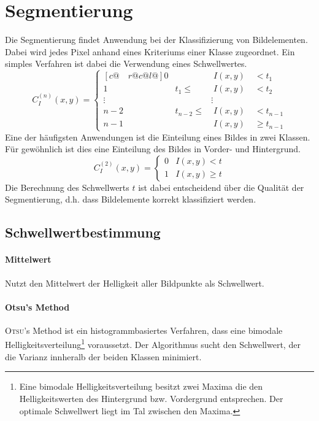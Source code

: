 \section*{Segmentierung}

Die Segmentierung findet Anwendung bei der Klassifizierung von Bildelementen.
Dabei wird jedes Pixel anhand eines Kriteriums einer Klasse zugeordnet.
Ein simples Verfahren ist dabei die Verwendung eines Schwellwertes.
  \[ C_I^{(n)}(x,y) = \begin{cases}[c@{\quad}r@{}c@{}l@{}]
       0      &              & \;I(x,y) & \;<    t_1     \\
       1      & t_1     \leq & \;I(x,y) & \;<    t_2     \\
       \vdots &              &   \vdots &                \\
       n-2    & t_{n-2} \leq & \;I(x,y) & \;<    t_{n-1} \\
       n-1    &              & \;I(x,y) & \;\geq t_{n-1}
     \end{cases} \]
Eine der häufigsten Anwendungen ist die Einteilung eines Bildes in zwei Klassen.
Für gewöhnlich ist dies eine Einteilung des Bildes in Vorder- und Hintergrund.
  \[ C_I^{(2)}(x,y) = \begin{cases}
       0 & I(x,y) <    t \\
       1 & I(x,y) \geq t
     \end{cases} \]
Die Berechnung des Schwellwerts $t$ ist dabei entscheidend über die Qualität der Segmentierung, d.h. dass Bildelemente korrekt klassifiziert werden.

\subsection*{Schwellwertbestimmung}

\paragraph{Mittelwert}
Nutzt den Mittelwert der Helligkeit aller Bildpunkte als Schwellwert.

\paragraph{Otsu's Method}
\textsc{Otsu}'s Method ist ein histogrammbasiertes Verfahren, dass eine bimodale Helligkeitsverteilung\footnote{Eine bimodale Helligkeitsverteilung besitzt zwei Maxima die den Helligkeitswerten des Hintergrund bzw. Vordergrund entsprechen. Der optimale Schwellwert liegt im Tal zwischen den Maxima.} voraussetzt.
Der Algorithmus sucht den Schwellwert, der die Varianz innheralb der beiden Klassen minimiert.

